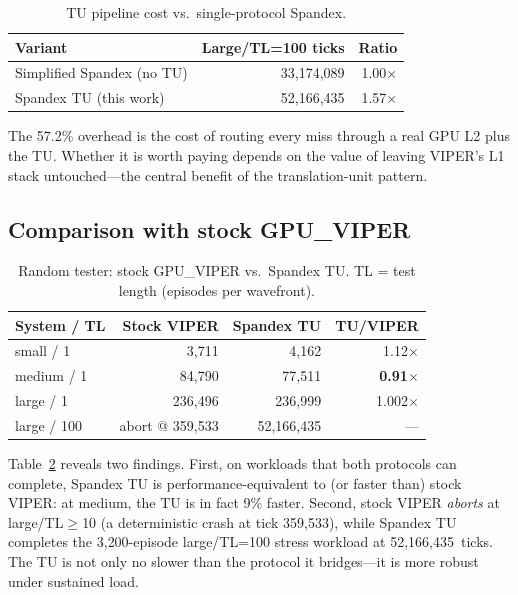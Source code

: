 \documentclass[conference,letterpaper,10pt]{IEEEtran}
\makeatletter
\def\spxRTsmall{4{,}162}
\def\spxRTmedium{77{,}511}
\def\spxRTlarge{52{,}166{,}435}
\def\spxRTlargeSimplified{33{,}174{,}089}
\def\spxRToverhead{57.2}
\def\viperRTsmall{3{,}711}
\def\viperRTmedium{84{,}790}
\def\viperRTlargeTLone{236{,}496}
\def\spxRTlargeTLone{236{,}999}
\def\viperRTlargeTLhundred{abort @ 359{,}533}
\makeatother
\begin{document}
\begin{table}[t]
\centering
\caption{TU pipeline cost vs.\ single-protocol Spandex.}
\label{tab:overhead}
\small
\begin{tabular}{lrr}
\toprule
\textbf{Variant} & \textbf{Large/TL=100 ticks} & \textbf{Ratio} \\
\midrule
Simplified Spandex (no TU) & \spxRTlargeSimplified & 1.00$\times$ \\
Spandex TU (this work)     & \spxRTlarge          & 1.57$\times$ \\
\bottomrule
\end{tabular}
\end{table}

The \spxRToverhead\% overhead is the cost of routing every miss
through a real GPU L2 plus the TU. Whether it is worth paying depends
on the value of leaving VIPER's L1 stack untouched---the central
benefit of the translation-unit pattern.

\subsection{Comparison with stock GPU\_VIPER}

\begin{table}[t]
\centering
\caption{Random tester: stock GPU\_VIPER vs.\ Spandex TU. TL = test
length (episodes per wavefront).}
\label{tab:viper-cmp}
\small
\begin{tabular}{lrrr}
\toprule
\textbf{System / TL} & \textbf{Stock VIPER} & \textbf{Spandex TU} & \textbf{TU/VIPER} \\
\midrule
small  / 1   & \viperRTsmall          & \spxRTsmall         & 1.12$\times$ \\
medium / 1   & \viperRTmedium         & \spxRTmedium        & \textbf{0.91}$\times$ \\
large  / 1   & \viperRTlargeTLone     & \spxRTlargeTLone    & 1.002$\times$ \\
large  / 100 & \viperRTlargeTLhundred & \spxRTlarge         & --- \\
\bottomrule
\end{tabular}
\end{table}

Table~\ref{tab:viper-cmp} reveals two findings. First, on workloads
that both protocols can complete, Spandex TU is performance-equivalent
to (or faster than) stock VIPER: at medium, the TU is in fact 9\%
faster. Second, stock VIPER \emph{aborts} at large/TL$\geq$10 (a
deterministic crash at tick 359{,}533), while Spandex TU completes the
3{,}200-episode large/TL=100 stress workload at \spxRTlarge\ ticks.
The TU is not only no slower than the protocol it bridges---it is more
robust under sustained load.
\end{document}
